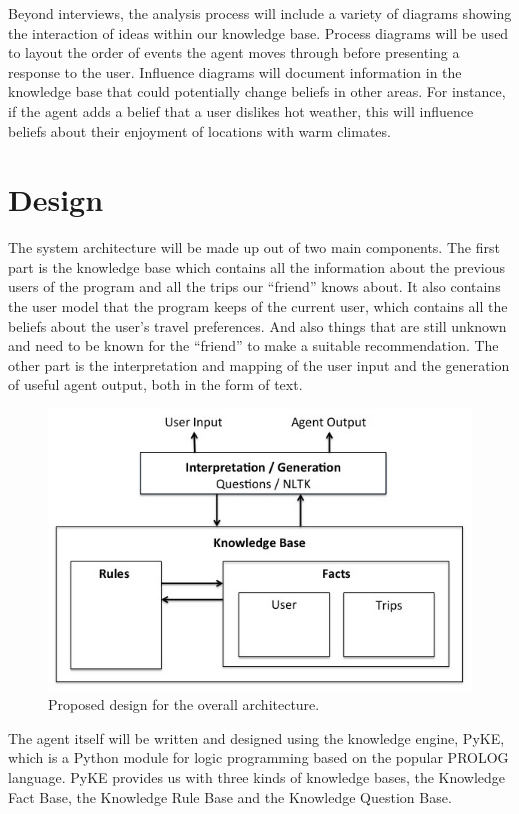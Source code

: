 \documentclass[11pt]{article} %
\begin{document}
Beyond interviews, the analysis process will include a
variety of diagrams showing the interaction of ideas
within our knowledge base. Process diagrams will be used
to layout the order of events the agent moves through
before presenting a response to the user.
Influence diagrams will document information in the
knowledge base that could potentially change beliefs
in other areas. For instance, if the agent adds a belief
that a user dislikes hot weather, this will influence
beliefs about their enjoyment of locations with warm climates.

\section{Design}
The system architecture will be made up out of two main
components. The first part is the knowledge base which contains all the
information about the previous users of the program and
all the trips our ``friend'' knows about. It also contains
the user model that the program keeps of the current
user, which contains all the beliefs about the user’s
travel preferences. And also things that are still unknown
and need to be known for the ``friend'' to make a suitable
recommendation. The other part is the interpretation and
mapping of the user input and the generation of useful
agent output, both in the form of text.

\begin{figure}[H]
\centering
\includegraphics[width=12cm]{architecture.jpg}
\caption{Proposed design for the overall architecture.}
\end{figure}

The agent itself will be written and designed using the
knowledge engine, PyKE, which is a Python module for logic
programming based on the popular PROLOG language.
PyKE provides us with three kinds of knowledge bases,
the Knowledge Fact Base, the Knowledge Rule Base and
the Knowledge Question Base.
\end{document}
